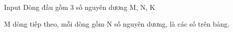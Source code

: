 Input
Dòng đầu gồm 3 số nguyên dương M, N, K

M dòng tiếp theo, mỗi dòng gồm N số nguyên dương, là các số trên bảng.